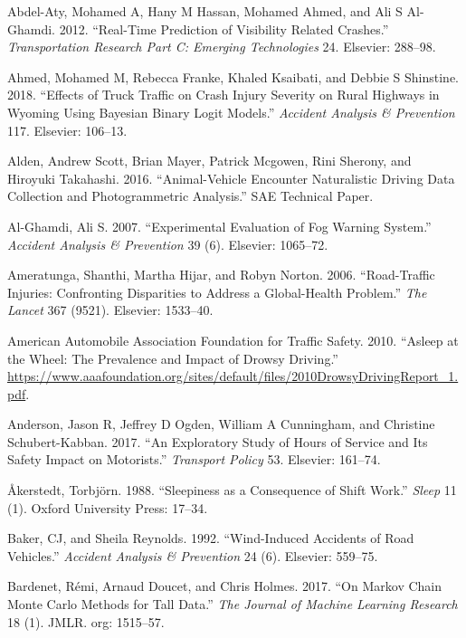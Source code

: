 \documentclass[12pt]{book}
\numberwithin{equation}{chapter}
\begin{document}
\hypertarget{refs}{}
\leavevmode\hypertarget{ref-abdel2012real}{}%
Abdel-Aty, Mohamed A, Hany M Hassan, Mohamed Ahmed, and Ali S Al-Ghamdi. 2012. ``Real-Time Prediction of Visibility Related Crashes.'' \emph{Transportation Research Part C: Emerging Technologies} 24. Elsevier: 288--98.

\leavevmode\hypertarget{ref-ahmed2018effects}{}%
Ahmed, Mohamed M, Rebecca Franke, Khaled Ksaibati, and Debbie S Shinstine. 2018. ``Effects of Truck Traffic on Crash Injury Severity on Rural Highways in Wyoming Using Bayesian Binary Logit Models.'' \emph{Accident Analysis \& Prevention} 117. Elsevier: 106--13.

\leavevmode\hypertarget{ref-alden2016animal}{}%
Alden, Andrew Scott, Brian Mayer, Patrick Mcgowen, Rini Sherony, and Hiroyuki Takahashi. 2016. ``Animal-Vehicle Encounter Naturalistic Driving Data Collection and Photogrammetric Analysis.'' SAE Technical Paper.

\leavevmode\hypertarget{ref-al2007experimental}{}%
Al-Ghamdi, Ali S. 2007. ``Experimental Evaluation of Fog Warning System.'' \emph{Accident Analysis \& Prevention} 39 (6). Elsevier: 1065--72.

\leavevmode\hypertarget{ref-ameratunga2006road}{}%
Ameratunga, Shanthi, Martha Hijar, and Robyn Norton. 2006. ``Road-Traffic Injuries: Confronting Disparities to Address a Global-Health Problem.'' \emph{The Lancet} 367 (9521). Elsevier: 1533--40.

\leavevmode\hypertarget{ref-aaafoundation}{}%
American Automobile Association Foundation for Traffic Safety. 2010. ``Asleep at the Wheel: The Prevalence and Impact of Drowsy Driving.'' \url{https://www.aaafoundation.org/sites/default/files/2010DrowsyDrivingReport_1.pdf}.

\leavevmode\hypertarget{ref-anderson2017exploratory}{}%
Anderson, Jason R, Jeffrey D Ogden, William A Cunningham, and Christine Schubert-Kabban. 2017. ``An Exploratory Study of Hours of Service and Its Safety Impact on Motorists.'' \emph{Transport Policy} 53. Elsevier: 161--74.

\leavevmode\hypertarget{ref-aakerstedt1988sleepiness}{}%
Åkerstedt, Torbjörn. 1988. ``Sleepiness as a Consequence of Shift Work.'' \emph{Sleep} 11 (1). Oxford University Press: 17--34.

\leavevmode\hypertarget{ref-baker1992wind}{}%
Baker, CJ, and Sheila Reynolds. 1992. ``Wind-Induced Accidents of Road Vehicles.'' \emph{Accident Analysis \& Prevention} 24 (6). Elsevier: 559--75.

\leavevmode\hypertarget{ref-bardenet2017markov}{}%
Bardenet, Rémi, Arnaud Doucet, and Chris Holmes. 2017. ``On Markov Chain Monte Carlo Methods for Tall Data.'' \emph{The Journal of Machine Learning Research} 18 (1). JMLR. org: 1515--57.
\end{document}
